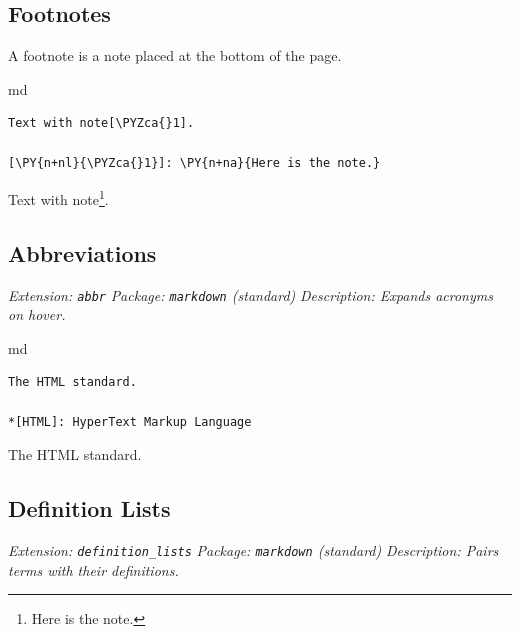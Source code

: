 \documentclass[a4paper,twoside]{article}
\begin{document}
\subsection{Footnotes}\label{footnotes}

A footnote is a note placed at the bottom of the page.

\begin{code}{md}{}{}
\begin{Verbatim}[commandchars=\\\{\},breaklines, breakanywhere, commandchars=\\\{\}]
Text with note[\PYZca{}1].

[\PY{n+nl}{\PYZca{}1}]: \PY{n+na}{Here is the note.}
\end{Verbatim}
\end{code}
\begin{displayquote}

Text with note\footnote{Here is the note.}.

\end{displayquote}
\subsection{Abbreviations}\label{abbreviations}

\emph{Extension: \texttt{abbr}}
\emph{Package: \texttt{markdown} (standard)}
\emph{Description: Expands acronyms on hover.}

\begin{code}{md}{}{}
\begin{Verbatim}[commandchars=\\\{\},breaklines, breakanywhere, commandchars=\\\{\}]
The HTML standard.

*[HTML]: HyperText Markup Language
\end{Verbatim}
\end{code}
\begin{displayquote}

The \acrshort{HTML} standard.

\end{displayquote}
\subsection{Definition Lists}\label{definition-lists}

\emph{Extension: \texttt{definition\_lists}}
\emph{Package: \texttt{markdown} (standard)}
\emph{Description: Pairs terms with their definitions.}
\end{document}
